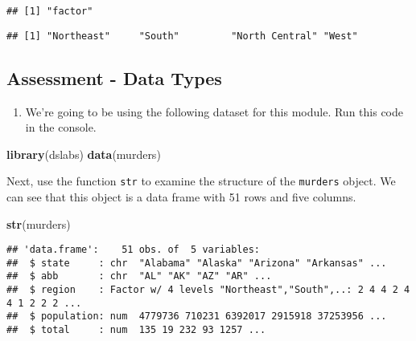 \documentclass[]{article}
\newenvironment{Shaded}{\begin{snugshade}}{\end{snugshade}}
\newcommand{\CommentTok}[1]{\textcolor[rgb]{0.56,0.35,0.01}{\textit{#1}}}
\newcommand{\KeywordTok}[1]{\textcolor[rgb]{0.13,0.29,0.53}{\textbf{#1}}}
\newcommand{\NormalTok}[1]{#1}
\newcommand{\OperatorTok}[1]{\textcolor[rgb]{0.81,0.36,0.00}{\textbf{#1}}}
\providecommand{\tightlist}{%
  \setlength{\itemsep}{0pt}\setlength{\parskip}{0pt}}
\begin{document}
\begin{verbatim}
## [1] "factor"
\end{verbatim}

\begin{Shaded}
\end{Shaded}

\begin{verbatim}
## [1] "Northeast"     "South"         "North Central" "West"
\end{verbatim}

\hypertarget{assessment---data-types}{%
\subsection{Assessment - Data Types}\label{assessment---data-types}}

\begin{enumerate}
\def\labelenumi{\arabic{enumi}.}
\tightlist
\item
  We're going to be using the following dataset for this module. Run
  this code in the console.
\end{enumerate}

\begin{Shaded}
\begin{Highlighting}[]
\KeywordTok{library}\NormalTok{(dslabs)  }
\KeywordTok{data}\NormalTok{(murders)}
\end{Highlighting}
\end{Shaded}

Next, use the function \texttt{str} to examine the structure of the
\texttt{murders} object. We can see that this object is a data frame
with 51 rows and five columns.

\begin{Shaded}
\begin{Highlighting}[]
\KeywordTok{str}\NormalTok{(murders)}
\end{Highlighting}
\end{Shaded}

\begin{verbatim}
## 'data.frame':    51 obs. of  5 variables:
##  $ state     : chr  "Alabama" "Alaska" "Arizona" "Arkansas" ...
##  $ abb       : chr  "AL" "AK" "AZ" "AR" ...
##  $ region    : Factor w/ 4 levels "Northeast","South",..: 2 4 4 2 4 4 1 2 2 2 ...
##  $ population: num  4779736 710231 6392017 2915918 37253956 ...
##  $ total     : num  135 19 232 93 1257 ...
\end{verbatim}
\end{document}
